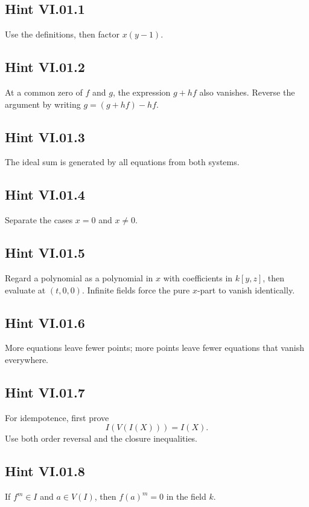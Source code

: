 
\subsection*{Hint VI.01.1}
Use the definitions, then factor \(x(y-1)\).

\subsection*{Hint VI.01.2}
At a common zero of \(f\) and \(g\), the expression \(g+hf\) also vanishes.  Reverse the
argument by writing \(g=(g+hf)-hf\).

\subsection*{Hint VI.01.3}
The ideal sum is generated by all equations from both systems.

\subsection*{Hint VI.01.4}
Separate the cases \(x=0\) and \(x\neq0\).

\subsection*{Hint VI.01.5}
Regard a polynomial as a polynomial in \(x\) with coefficients in \(k[y,z]\), then evaluate
at \((t,0,0)\).  Infinite fields force the pure \(x\)-part to vanish identically.

\subsection*{Hint VI.01.6}
More equations leave fewer points; more points leave fewer equations that vanish everywhere.

\subsection*{Hint VI.01.7}
For idempotence, first prove
\[
  I(V(I(X)))=I(X).
\]
Use both order reversal and the closure inequalities.

\subsection*{Hint VI.01.8}
If \(f^m\in I\) and \(a\in V(I)\), then \(f(a)^m=0\) in the field \(k\).

